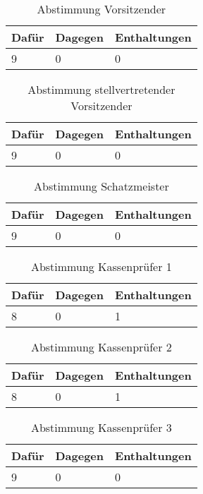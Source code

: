 \documentclass[a4paper]{scrartcl}
\begin{document}
\clearpage

\begin{table}[h]
\begin{tabularx}{\textwidth}{XXX}
Dafür & Dagegen & Enthaltungen\\
\toprule
9 & 0 & 0\\
\end{tabularx}
\caption{Abstimmung Vorsitzender}
\end{table}

\begin{table}[h]
\begin{tabularx}{\textwidth}{XXX}
Dafür & Dagegen & Enthaltungen\\
\toprule
9 & 0 & 0\\
\end{tabularx}
\caption{Abstimmung stellvertretender Vorsitzender}
\end{table}

\begin{table}[h]
\begin{tabularx}{\textwidth}{XXX}
Dafür & Dagegen & Enthaltungen\\
\toprule
9 & 0 & 0\\
\end{tabularx}
\caption{Abstimmung Schatzmeister}
\end{table}

\clearpage

\begin{table}[h]
\begin{tabularx}{\textwidth}{XXX}
Dafür & Dagegen & Enthaltungen\\
\toprule
8 & 0 & 1\\
\end{tabularx}
\caption{Abstimmung Kassenprüfer 1}
\end{table}

\begin{table}[h]
\begin{tabularx}{\textwidth}{XXX}
Dafür & Dagegen & Enthaltungen\\
\toprule
8 & 0 & 1\\
\end{tabularx}
\caption{Abstimmung Kassenprüfer 2}
\end{table}

\begin{table}[h]
\begin{tabularx}{\textwidth}{XXX}
Dafür & Dagegen & Enthaltungen\\
\toprule
9 & 0 & 0\\
\end{tabularx}
\caption{Abstimmung Kassenprüfer 3}
\end{table}
\end{document}
